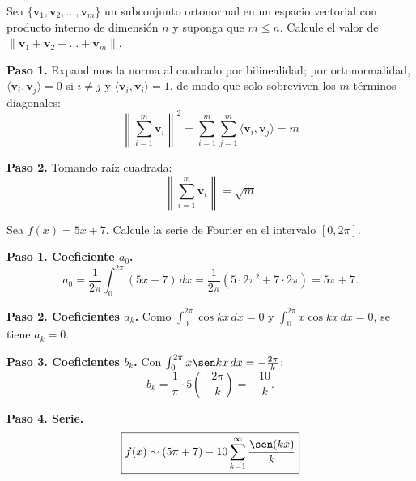 \begin{prob}
Sea $\{\mathbf{v}_1, \mathbf{v}_2, \dots, \mathbf{v}_m\}$ un subconjunto ortonormal en un espacio vectorial con producto interno de dimensión $n$ y suponga que $m\leq n$. Calcule el valor de $\lVert  \mathbf{v}_1+ \mathbf{v}_2+\dots +  \mathbf{v}_m \rVert$.
\begin{myproof}
\textbf{Paso 1.} Expandimos la norma al cuadrado por bilinealidad; por ortonormalidad, $\langle \mathbf{v}_i, \mathbf{v}_j \rangle = 0$ si $i \neq j$ y $\langle \mathbf{v}_i, \mathbf{v}_i \rangle = 1$, de modo que solo sobreviven los $m$ términos diagonales:
\[
\left\| \sum_{i=1}^m \mathbf{v}_i \right\|^2 = \sum_{i=1}^m \sum_{j=1}^m \langle \mathbf{v}_i, \mathbf{v}_j \rangle = m
\]

\textbf{Paso 2.} Tomando raíz cuadrada:
\[
\boxed{\left\| \sum_{i=1}^m \mathbf{v}_i \right\| = \sqrt{m}}
\]
\end{myproof}
\end{prob}

\begin{prob}
Sea $f(x)=5x+7$. Calcule la serie de Fourier en el intervalo $[0,2\pi]$.
\begin{myproof}
\textbf{Paso 1. Coeficiente $a_0$.}
\[
a_0 = \frac{1}{2\pi}\int_0^{2\pi} (5x+7)\,dx = \frac{1}{2\pi}\left(5\cdot 2\pi^2 + 7\cdot 2\pi\right) = 5\pi + 7.
\]

\textbf{Paso 2. Coeficientes $a_k$.} Como $\int_0^{2\pi} \cos kx\,dx = 0$ y $\int_0^{2\pi} x\cos kx\,dx = 0$, se tiene $a_k = 0$.

\textbf{Paso 3. Coeficientes $b_k$.} Con $\int_0^{2\pi} x\sen kx\,dx = -\frac{2\pi}{k}$:
\[
b_k = \frac{1}{\pi}\cdot 5\left(-\frac{2\pi}{k}\right) = -\frac{10}{k}.
\]

\textbf{Paso 4. Serie.}
\[
\boxed{f(x) \sim (5\pi + 7) - 10 \sum_{k=1}^{\infty} \frac{\sen(kx)}{k}}
\]
\end{myproof}
\end{prob}


